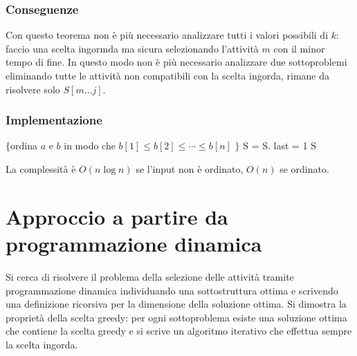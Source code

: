 \subsubsection{Conseguenze}
Con questo teorema non \`e pi\`u necessario analizzare tutti i valori possibili di $k$: faccio una scelta ingormda ma sicura selezionando l'attivit\`a $m$ con il minor tempo di fine.
In questo modo non \`e pi\`u necessario analizzare due sottoproblemi eliminando tutte le attivit\`a non compatibili con la scelta ingorda, rimane da risolvere solo $S[m\dots j]$. 
\subsubsection{Implementazione}
\begin{algorithm}[H]
\DontPrintSemicolon
{}






\SetKwFunction{}{}
\SetKwFunction{}{}
\SetKwFunction{}{}
\SetKwFunction{}{}
\SetKwFunction{}{}


\caption{\protect\Set \protect{}}
$\{$ordina $a$ e $b$ in modo che $b[1]\le b[2]\le\cdots\le b[n]$ $\}$\;
\Set S = \SetCos{}\;
S.\;
\Int last = 1\;
\Return S\;
\end{algorithm}
La complessit\`a \`e $O(n\log n)$ se l'input non \`e ordinato, $O(n)$ se ordinato. 
\section{Approccio a partire da programmazione dinamica}
Si cerca di risolvere il problema della selezione delle attivit\`a tramite programmazione dinamica individuando una sottostruttura ottima e scrivendo una definizione ricorsiva per la
dimensione della soluzione ottima. Si dimostra la propriet\`a della scelta greedy: per ogni sottoproblema esiste una soluzione ottima che contiene la scelta greedy e si scrive un
algoritmo iterativo che effettua sempre la scelta ingorda.
